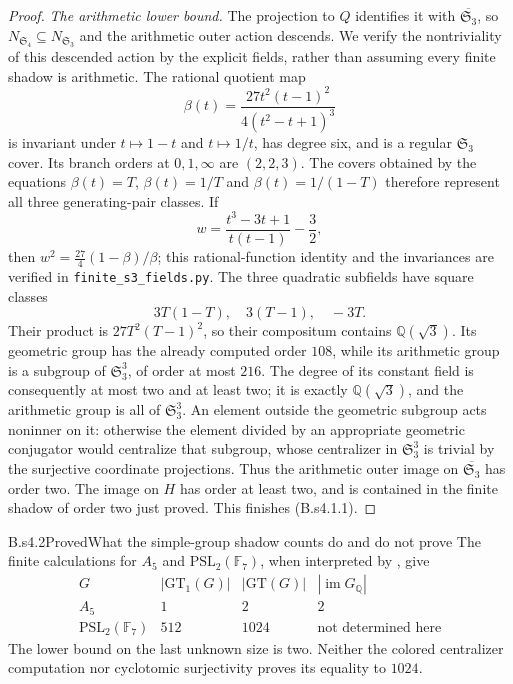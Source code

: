 \begin{proof}
\emph{The arithmetic lower bound.}
The projection to $Q$ identifies it with
$\overline{\mathfrak S_3}$, so $N_{\mathfrak S_4}\subseteq
N_{\mathfrak S_3}$ and the arithmetic outer action descends. We verify the
nontriviality of this descended action by the explicit fields, rather than
assuming every finite shadow is arithmetic. The rational quotient map
\[
 \beta(t)=\frac{27t^2(t-1)^2}{4(t^2-t+1)^3}
\]
is invariant under $t\mapsto1-t$ and $t\mapsto1/t$, has degree six,
and is a regular $\mathfrak S_3$ cover. Its branch orders at $0,1,\infty$
are $(2,2,3)$. The covers obtained by the equations
$\beta(t)=T$, $\beta(t)=1/T$ and $\beta(t)=1/(1-T)$ therefore represent
all three generating-pair classes. If
\[
 w=\frac{t^3-3t+1}{t(t-1)}-\frac32,
\]
then $w^2=\frac{27}{4}(1-\beta)/\beta$; this rational-function identity
and the invariances are verified in \texttt{finite\_s3\_fields.py}.
The three quadratic subfields have square classes
\[
 3T(1-T),\quad3(T-1),\quad-3T.
\]
Their product is $27T^2(T-1)^2$, so their compositum contains
$\mathbb Q(\sqrt3)$. Its geometric group has the already computed order
$108$, while its arithmetic group is a subgroup of $\mathfrak S_3^3$,
of order at most $216$. The degree of its constant field is consequently
at most two and at least two; it is exactly $\mathbb Q(\sqrt3)$, and
the arithmetic group is all of $\mathfrak S_3^3$. An element outside the
geometric subgroup acts noninner on it: otherwise the element divided
by an appropriate geometric conjugator would centralize that subgroup,
whose centralizer in $\mathfrak S_3^3$ is trivial by the surjective
coordinate projections. Thus the arithmetic outer image on
$\overline{\mathfrak S_3}$ has order two. The image on $H$ has order
at least two, and is contained in the finite shadow of order two just
proved. This finishes (B.s4.1.1).
\end{proof}

\begin{claim}{B.s4.2}{Proved}{What the simple-group shadow counts do and do not prove}
The finite calculations for $A_5$ and $\mathrm{PSL}_2(\mathbb F_7)$,
when interpreted by \citet[Theorem 4.9]{Guillot2015root}, give
\[
\begin{array}{c|rrr}
 G&|\mathrm{GT}_1(G)|&|\mathrm{GT}(G)|&
       |\operatorname{im}G_{\mathbb Q}|\\\hline
 A_5&1&2&2\\
 \mathrm{PSL}_2(\mathbb F_7)&512&1024&\text{not determined here}
\end{array}
\]
The lower bound on the last unknown size is two. Neither the colored
centralizer computation nor cyclotomic surjectivity proves its equality
to $1024$.
\end{claim}

